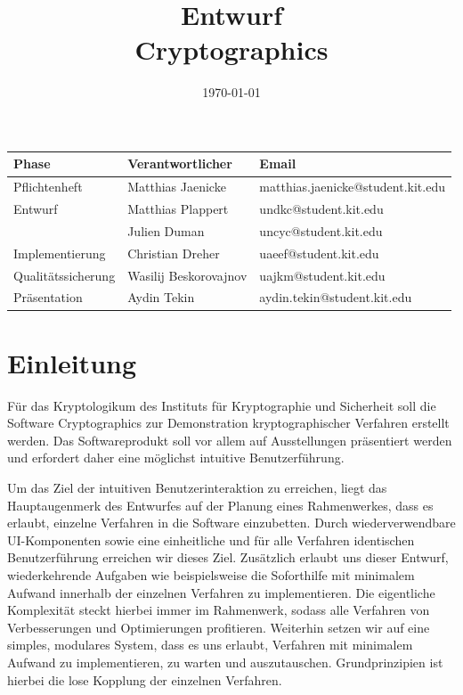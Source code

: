 \documentclass{article}
\title{\textbf{Entwurf} \\ Cryptographics}
\author{}
\date{\today}
\begin{document}
\maketitle
\begin{table}[b]
  \begin{tabular}{| l | l | l |}
    \hline
    \textbf{Phase} & \textbf{Verantwortlicher} & \textbf{Email} \\ \hline
    Pflichtenheft & Matthias Jaenicke & matthias.jaenicke@student.kit.edu \\ \hline
    Entwurf & Matthias Plappert & undkc@student.kit.edu \\
            & Julien Duman & uncyc@student.kit.edu \\ \hline
    Implementierung & Christian Dreher & uaeef@student.kit.edu \\ \hline
    Qualitätssicherung & Wasilij Beskorovajnov & uajkm@student.kit.edu \\ \hline
    Präsentation & Aydin Tekin & aydin.tekin@student.kit.edu \\ \hline
    \end{tabular}
\end{table}
\thispagestyle{empty}
\newpage

\tableofcontents
\newpage

\section{Einleitung}
Für das Kryptologikum des Instituts für Kryptographie und Sicherheit soll die Software Cryptographics zur Demonstration kryptographischer Verfahren erstellt werden. Das Softwareprodukt soll vor allem auf Ausstellungen präsentiert werden und erfordert daher eine möglichst intuitive Benutzerführung.

Um das Ziel der intuitiven Benutzerinteraktion zu erreichen, liegt das Hauptaugenmerk des Entwurfes auf der Planung eines Rahmenwerkes, dass es erlaubt, einzelne Verfahren in die Software einzubetten. Durch wiederverwendbare UI-Komponenten sowie eine einheitliche und für alle Verfahren identischen Benutzerführung erreichen wir dieses Ziel. Zusätzlich erlaubt uns dieser Entwurf, wiederkehrende Aufgaben wie beispielsweise die Soforthilfe mit minimalem Aufwand innerhalb der einzelnen Verfahren zu implementieren. Die eigentliche Komplexität steckt hierbei immer im Rahmenwerk, sodass alle Verfahren von Verbesserungen und Optimierungen profitieren. Weiterhin setzen wir auf eine simples, modulares System, dass es uns erlaubt, Verfahren mit minimalem Aufwand zu implementieren, zu warten und auszutauschen. Grundprinzipien ist hierbei die lose Kopplung der einzelnen Verfahren.
\end{document}
